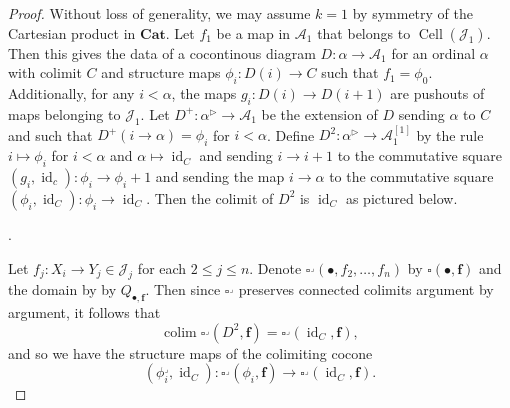 \documentclass[a4paper]{article}
\numberwithin{equation}{subsection}
\theoremstyle{plain}   %
\theoremstyle{definition}
\theoremstyle{remark}
\theoremstyle{plain}
\DeclareMathOperator{\id}{id}
\DeclareMathOperator{\colim}{colim}
\newcommand{\Cat}{\ensuremath{\mathbf{Cat}}}
\begin{document}
\begin{proof}
	Without loss of generality, we may assume \(k=1\) by symmetry of the Cartesian product in \(\Cat\). 
	Let \(f_1\) be a map in \(\mathcal{A}_1\) that belongs to \(\operatorname{Cell}(\mathscr{J}_1)\).  Then this gives the data of a cocontinous diagram \(D:\alpha \to \mathcal{A}_1\) for an ordinal \(\alpha\) with colimit \(C\) and structure maps \(\phi_i: D(i)\to C\) such that \(f_1=\phi_0\).  Additionally, for any \(i <\alpha\), the maps \(g_i:D(i)\to D(i+1)\) are pushouts of maps belonging to \(\mathscr{J}_1\).
	Let \(D^+:\alpha^\triangleright \to \mathcal{A}_1\) be the extension of \(D\) sending \(\alpha\) to \(C\) and such that \(D^+(i\to \alpha)=\phi_i\) for \(i<\alpha\).  Define \(D^2: \alpha^\triangleright \to \mathcal{A}_1^{[1]}\) by the rule \(i\mapsto \phi_i\) for \(i<\alpha\) and \(\alpha\mapsto \id_C\) and sending \(i\to i+1\) to the commutative square \((g_i,\id_c):\phi_i\to \phi_i+1\) and sending the map \(i\to \alpha\) to the commutative square \((\phi_i,\id_C):\phi_i\to \id_C\).  Then the colimit of \(D^2\) is \(\id_C\) as pictured below.
	\begin{center}
		.
	\end{center}
	Let \(f_j:X_i\to Y_j \in \mathscr{J}_j\) for each \(2\leq j\leq n\). Denote \(\square^\lrcorner(\bullet,f_2,\dots, f_n)\) by \(\square(\bullet,\mathbf{f})\) and the domain by by \(Q_{\bullet,\mathbf{f}}\).  Then since \(\square^\lrcorner\) preserves connected colimits argument by argument, it follows that 
	\[
		\colim\square^\lrcorner(D^2,\mathbf{f})=\square^\lrcorner(\id_C,\mathbf{f}),
	\]
	and so we have the structure maps of the colimiting cocone
	\[
		(\phi_i^\lrcorner,\id_C): \square^\lrcorner(\phi_i,\mathbf{f}) \to \square^\lrcorner(\id_C,\mathbf{f}).
\]
\end{proof}
\end{document}
